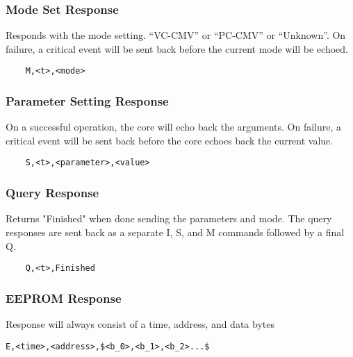\documentclass[10pt]{article}
\begin{document}
\subsubsection{Mode Set Response}
Responds with the mode setting. ``VC-CMV'' or ``PC-CMV'' or ``Unknown''. On failure, a critical event will be sent back before the current mode will be echoed.
\begin{lstlisting}
	M,<t>,<mode>
\end{lstlisting}

\subsubsection{Parameter Setting Response}
On a successful operation, the core will echo back the arguments. On failure, a critical event will be sent back before the core echoes back the current value.
\begin{lstlisting}
	S,<t>,<parameter>,<value>
\end{lstlisting}

\subsubsection{Query Response}
Returns "Finished" when done sending the parameters and mode. The query responses are sent back as a separate I, S, and M commands followed by a final Q.
\begin{lstlisting}
	Q,<t>,Finished
\end{lstlisting}

\subsubsection{EEPROM Response}
Response will always consist of a time, address, and data bytes
\begin{lstlisting}[mathescape=true]
	E,<time>,<address>,$<b_0>,<b_1>,<b_2>...$
\end{lstlisting}
\end{document}
